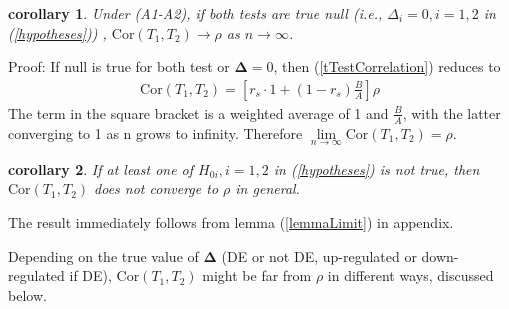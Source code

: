 \documentclass[11pt, a4paper]{article}
\newtheorem{corollary}{corollary}
\begin{document}
\begin{corollary} 
	Under (A1-A2), if both tests are true null (i.e., $\Delta_i = 0, i=1, 2$ in (\ref{hypotheses})) , $\text{Cor}({T_1, T_2})\rightarrow \rho$ as $n \rightarrow \infty$. 
\end{corollary}
Proof:  If null is true for both test or $\bm \Delta  = 0$, then (\ref{tTestCorrelation}) reduces to 
\begin{align}\label{CalculateTCor}
	\text{Cor}(T_1, T_2) = \left[r_s \cdot 1 + (1-r_s)\frac{B}{A}\right]\rho
\end{align}
The term in the square bracket is a weighted average of 1 and $\frac{B}{A}$, with the latter converging to 1 as n grows to infinity. Therefore $\lim\limits_{n\rightarrow\infty} \text{Cor}({T_1, T_2}) = \rho$.
\begin{corollary} 
	If at least one of $H_{0i}, i = 1, 2$ in (\ref{hypotheses}) is not true, then  $\text{Cor}({T_1, T_2})$ does not converge to $\rho$ in general.
\end{corollary} 
The result immediately follows from lemma  (\ref{lemmaLimit}) in appendix.
 
Depending on the true value of $\bm\Delta$ (DE or not DE, up-regulated or down-regulated if DE), $\text{Cor}({T_1, T_2})$ might be far from $\rho$ in different ways, discussed below.
\end{document}
